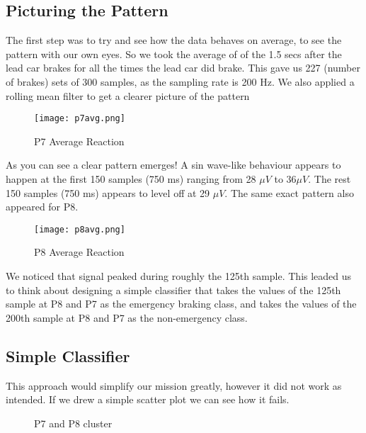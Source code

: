 \documentclass{article}
\begin{document}
\subsection{Picturing the Pattern}
The first step was to try and see how the data behaves on average, to see the pattern with our own eyes. So we took the average of of the 1.5 secs after the lead car brakes for all the times the lead car did brake. This gave us 227 (number of brakes) sets of 300 samples, as the sampling rate is 200 Hz. We also applied a rolling mean filter to get a clearer picture of the pattern

\begin{center}
\begin{figure}[H]
\centering
\texttt{[image: p7avg.png]}
\caption{P7 Average Reaction}
\label{fig:p7avg}
\end{figure}
\end{center}

As you can see a clear pattern emerges! A sin wave-like behaviour appears to happen at the first 150 samples (750 ms) ranging from 28 \(\mu V\)  to  \(36 \mu V\).
The rest 150 samples (750 ms) appears to level off at 29 \(\mu V\).
\newline
The same exact pattern also appeared for P8.

\begin{center}
\begin{figure}[H]
\centering
\texttt{[image: p8avg.png]}
\caption{P8 Average Reaction}
\label{fig:p8avg}
\end{figure}
\end{center}

We noticed that signal peaked during roughly the 125th sample. This leaded us to think about designing a simple classifier that takes the values of the 125th sample at P8 and P7 as the emergency braking class, and takes the values of the 200th sample at P8 and P7 as the non-emergency class.

\subsection{Simple Classifier}

This approach would simplify our mission greatly, however it did not work as intended. If we drew a simple scatter plot we can see how it fails.

\begin{figure}[H]
    \centering
    \qquad
    \caption{P7 and P8 cluster}%
    \label{fig:example}
\end{figure}
\end{document}
